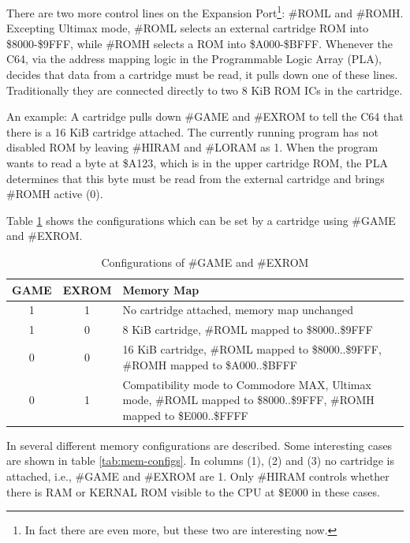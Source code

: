 \documentclass[a4paper,oneside]{memoir}
\begin{document}
There are two more control lines on the Expansion 
Port\footnote{In fact there are even more, but these two are interesting now.}:
\#ROML and \#ROMH. Excepting Ultimax mode, \#ROML selects an external
cartridge ROM into \$8000-\$9FFF, while \#ROMH selects a ROM into
\$A000-\$BFFF. Whenever the C64, via the address mapping logic in
the Programmable Logic Array (PLA), decides that data from a
cartridge must be read, it pulls down one of these lines.
Traditionally they are connected directly to two 8 KiB ROM ICs in
the cartridge.

An example: A cartridge pulls down \#GAME and \#EXROM to tell the C64
that there is a 16 KiB cartridge attached. The currently running
program has not disabled ROM by leaving \#HIRAM and \#LORAM as 1. When
the program wants to read a byte at \$A123, which is in the upper
cartridge ROM, the PLA determines that this byte must be read from
the external cartridge and brings \#ROMH active (0).

Table \ref {tab:game-exrom} shows the configurations which can be set by a cartridge using \#GAME and \#EXROM.

\begin{table}
    \centering
    \begin{tabularx}{\textwidth}{ccX}
        \toprule
        GAME & EXROM & Memory Map \\
        \midrule
        1 & 1 & No cartridge attached, memory map unchanged \\[3pt]
        1 & 0 & 8 KiB cartridge, \#ROML mapped to \$8000..\$9FFF \\[3pt]
        0 & 0 & 16 KiB cartridge, \#ROML mapped to \$8000..\$9FFF, \#ROMH mapped to \$A000..\$BFFF \\[3pt]
        0 & 1 & Compatibility mode to Commodore MAX, Ultimax mode,
                \#ROML mapped to \$8000..\$9FFF, \#ROMH mapped to \$E000..\$FFFF \\[3pt]
        \bottomrule
    \end{tabularx}
    \caption{Configurations of \#GAME and \#EXROM}
    \label{tab:game-exrom}
\end{table}

In \cite[Appendix~A]{PLA12} several different memory configurations are described.
Some interesting cases are shown in table \ref {tab:mem-configs}.
In columns (1), (2) and (3) no cartridge is attached, i.e., \#GAME and \#EXROM are 1.
Only \#HIRAM controls whether there is RAM or KERNAL ROM visible to the CPU at \$E000 in these cases.
\end{document}
